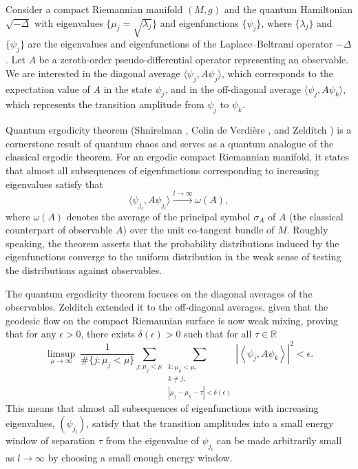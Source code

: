 \documentclass[11pt,twoside,reqno]{amsart} \usepackage{a4wide} \usepackage[T1]{fontenc} \usepackage[utf8]{inputenc} \usepackage{soul}  \usepackage{amsmath} \usepackage{amsfonts} \usepackage{amssymb} \usepackage{mathtools} \usepackage{amsthm} \usepackage{xcolor} \usepackage{graphicx} \usepackage{hyperref} \usepackage{standalone} \usepackage{esint} \usepackage{comment} \usepackage[left=2.3cm,top=3cm,right=2.3cm]{geometry} \usepackage{bm} \usepackage{svg} \usepackage{float} \numberwithin{equation}{section} \theoremstyle{plain} \newtheorem{thm}{Theorem}[section] \newtheorem{theorem}[thm]{Theorem} \newtheorem*{theorem*}{Theorem}\newtheorem{conj}[thm]{Conjecture} \newtheorem{lemma}[thm]{Lemma} \newtheorem{prop}[thm]{Proposition} \newtheorem{proposition}[thm]{Proposition} \newtheorem{cor}[thm]{Corollary} \newtheorem{question}[thm]{Question} \newtheorem{corollary}[thm]{Corollary} \newtheorem{assumption}[thm]{Assumption} \theoremstyle{definition} \newtheorem{defn}[thm]{Definition} \newtheorem{choice}[thm]{Choice} \newtheorem{definition}[thm]{Definition} \newtheorem{ex}[thm]{Example} \newtheorem{notation}[thm]{Notation} \newtheorem*{ack}{Acknowledgements} \theoremstyle{remark} \newtheorem{remark}[thm]{Remark} \newtheorem{bigremark}[thm]{Remark} \usepackage{xcolor} \newcommand{\red}[1]{ {\color{Red}#1} } \newcommand{\blue}[1]{ {\color{Blue}#1} } \author{Kai Hippi} \address{Aalto University, Espoo, Finland} \email{kai.hippi@aalto.fi}
\begin{document}
Consider a compact Riemannian manifold $(M,g)$ and the quantum Hamiltonian $\sqrt{-\Delta}$ with eigenvalues $ \{ \mu_{j} = \sqrt{ \lambda_{j} } \} $ and eigenfunctions $ \{ \psi_{j} \} $, where $ \{ \lambda_{j} \} $ and $ \{ \psi_{j} \} $ are the eigenvalues and eigenfunctions of the Laplace--Beltrami operator $ -\Delta $. Let $A$ be a zeroth-order pseudo-differential operator representing an observable. We are interested in the diagonal average $\langle \psi_j, A \psi_j \rangle$,
which corresponds to the expectation value of $A$ in the state $\psi_j$, and in the off-diagonal average $\langle \psi_j, A \psi_k \rangle$, which represents the transition amplitude from $\psi_j$ to $\psi_k$.

Quantum ergodicity theorem (Shnirelman \cite{Shn74}, Colin de Verdi\`{e}re \cite{CdV85}, and Zelditch \cite{Zel87}) is a cornerstone result of quantum chaos and serves as a quantum analogue of the classical ergodic theorem. For an ergodic compact Riemannian manifold, it states that almost all subsequences of eigenfunctions corresponding to increasing eigenvalues satisfy that
\[
	\langle \psi_{j_l}, A \psi_{j_l} \rangle \xrightarrow{l \to \infty} \omega(A),
\]
where $\omega(A)$ denotes the average of the principal symbol $\sigma_A$ of $A$ (the classical counterpart of observable $A$) over the unit co-tangent bundle of $M$. Roughly speaking, the theorem asserts that the probability distributions induced by the eigenfunctions converge to the uniform distribution in the weak sense of testing the distributions against observables.

The quantum ergodicity theorem focuses on the diagonal averages of the observables. Zelditch \cite{Zel90, Zel96a} extended it to the off-diagonal averages, given that the geodesic flow on the compact Riemannian surface is now weak mixing, proving that for any $\epsilon > 0$, there exists $\delta(\epsilon) > 0$ such that for all $\tau \in \mathbb{R}$
$$
\limsup_{\mu \to \infty} \
\frac{1}{\# \{ j  :  \mu_{j} < \mu \} } \sum_{j: \mu_{j} < \mu }^{} \sum_{\substack{ k: \mu_k < \mu , \\ k \neq j, \\   | \mu_{j} - \mu_k - \tau| < \delta(\epsilon)}}
\left| \left\langle \psi_j, A \psi_k \right\rangle \right|^2 < \epsilon.
$$
This means that almost all subsequences of eigenfunctions with increasing eigenvalues, $ ( \psi_{j_{l}} ) $, satisfy that the transition amplitudes into a small energy window of separation $ \tau $ from the eigenvalue of $ \psi_{j_{l}} $ can be made arbitrarily small as $ l \to \infty $ by choosing a small enough energy window.
\end{document}
